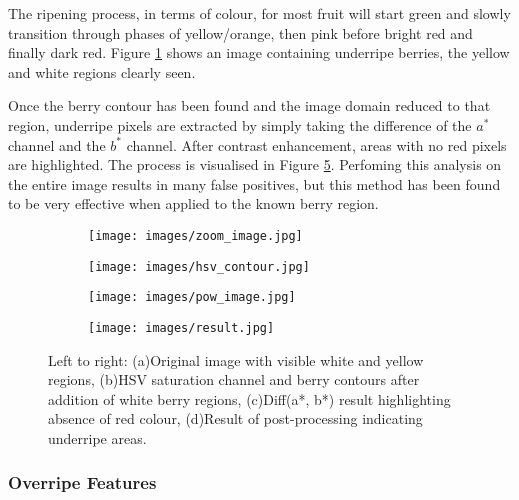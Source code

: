 \documentclass[conference]{IEEEtran}
\begin{document}
The ripening process, in terms of colour, for most fruit will start green and slowly transition through phases of yellow/orange, then pink before bright red and finally dark red. Figure \ref{fig:yellow_white} shows an image containing underripe berries, the yellow and white regions clearly seen.

Once the berry contour has been found and the image domain reduced to that region, underripe pixels are extracted by simply taking the difference of the $a^*$ channel and the $b^*$ channel. After contrast enhancement, areas with no red pixels are highlighted. The process is visualised in Figure \ref{fig:underripe_process}. Perfoming this analysis on the entire image results in many false positives, but this method has been found to be very effective when applied to the known berry region.   

\begin{figure}[ht]
	\centering
	\begin{subfigure}{.25\textwidth}
		\centering
		\texttt{[image: images/zoom\_image.jpg]}
		\caption{}
		\label{fig:yellow_white}
	\end{subfigure}%
	\begin{subfigure}{.25\textwidth}
		\centering
		\texttt{[image: images/hsv\_contour.jpg]}
		\caption{}
		\label{fig:hsv}
	\end{subfigure}%
	
	\begin{subfigure}{.25\textwidth}
		\centering
		\texttt{[image: images/pow\_image.jpg]}
		\caption{}
		\label{fig:pow_image}
	\end{subfigure}%
	\begin{subfigure}{.25\textwidth}
		\centering
		\texttt{[image: images/result.jpg]}
		\caption{}
		\label{fig:result}
	\end{subfigure}%
	
	\caption{Left to right: (a)Original image with visible white and yellow regions, (b)HSV saturation channel and berry contours after addition of white berry regions, (c)Diff(a*, b*) result highlighting absence of red colour, (d)Result of post-processing indicating underripe areas.}
	\label{fig:underripe_process}
\end{figure}


\subsubsection{Overripe Features}
\end{document}
